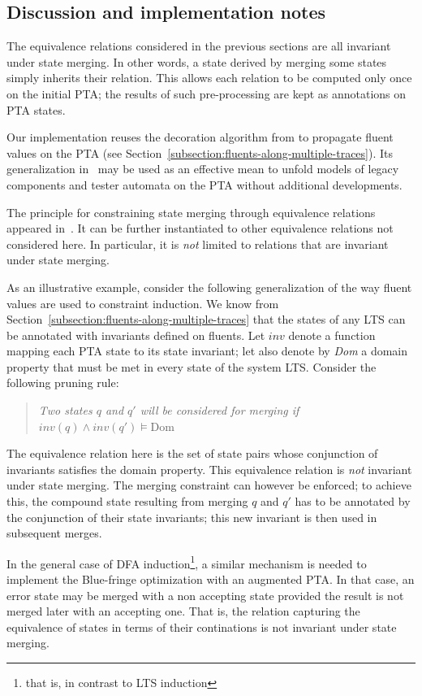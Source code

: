 \subsection{Discussion and implementation notes\label{subsection:qsm-constraints-implementation-notes}}

The equivalence relations considered in the previous sections are all invariant under state merging. In other words, a state derived by merging some states simply inherits their relation. This allows each relation to be computed only once on the initial PTA; the results of such pre-processing are kept as annotations on PTA states. 

Our implementation reuses the decoration algorithm from \cite{Damas:2006} to propagate fluent values on the PTA (see Section~\ref{subsection:fluents-along-multiple-traces}). Its generalization in~\cite{Damas:2011} may be used as an effective mean to unfold models of legacy components and tester automata on the PTA without additional developments.

The principle for constraining state merging through equivalence relations appeared in~\cite{Coste:1998, Coste:2004}. It can be further instantiated to other equivalence relations not considered here. In particular, it is \emph{not} limited to relations that are invariant under state merging.

As an illustrative example, consider the following generalization of the way fluent values are used to constraint induction. We know from Section~\ref{subsection:fluents-along-multiple-traces} that the states of any LTS can be annotated with invariants defined on fluents. Let $inv$ denote a function mapping each PTA state to its state invariant; let also denote by \emph{Dom} a domain property that must be met in every state of the system LTS. Consider the following pruning rule:
\begin{quote}
\emph{Two states $q$ and $q'$ will be considered for merging if $inv(q) \wedge inv(q') \models \mbox{Dom}$}
\end{quote}

The equivalence relation here is the set of state pairs whose conjunction of invariants satisfies the domain property. This equivalence relation is \emph{not} invariant under state merging. The merging constraint can however be enforced; to achieve this, the compound state resulting from merging $q$ and $q'$ has to be annotated by the conjunction of their state invariants; this new invariant is then used in subsequent merges.

In the general case of DFA induction\footnote{that is, in contrast to LTS induction}, a similar mechanism is needed to implement the Blue-fringe optimization with an augmented PTA. In that case, an error state may be merged with a non accepting state provided the result is not merged later with an accepting one. That is, the relation capturing the equivalence of states in terms of their continations is not invariant under state merging.
